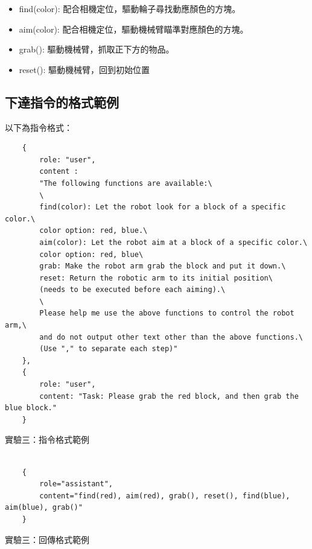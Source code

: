 \documentclass[class=NCU_thesis, crop=false]{standalone}
\begin{document}
\begin{itemize}
    \item find(color): 配合相機定位，驅動輪子尋找動應顏色的方塊。

    \item aim(color): 配合相機定位，驅動機械臂瞄準對應顏色的方塊。

    \item grab(): 驅動機械臂，抓取正下方的物品。

    \item reset(): 驅動機械臂，回到初始位置
\end{itemize}

\newpage
\subsection{下達指令的格式範例}
以下為指令格式：
\begin{listing}
    \begin{verbatim}
    {     
        role: "user",
        content : 
        "The following functions are available:\
        \
        find(color): Let the robot look for a block of a specific color.\
        color option: red, blue.\
        aim(color): Let the robot aim at a block of a specific color.\
        color option: red, blue\
        grab: Make the robot arm grab the block and put it down.\
        reset: Return the robotic arm to its initial position\
        (needs to be executed before each aiming).\
        \
        Please help me use the above functions to control the robot arm,\
        and do not output other text other than the above functions.\
        (Use "," to separate each step)"
    },
    {
        role: "user", 
        content: "Task: Please grab the red block, and then grab the blue block."
    }
    \end{verbatim}
\caption{實驗三：指令格式範例} 
\end{listing}

\begin{listing}
    \begin{verbatim}

    {
        role="assistant",
        content="find(red), aim(red), grab(), reset(), find(blue), aim(blue), grab()"
    }

    \end{verbatim}
\caption{實驗三：回傳格式範例} 
\end{listing}
\end{document}
